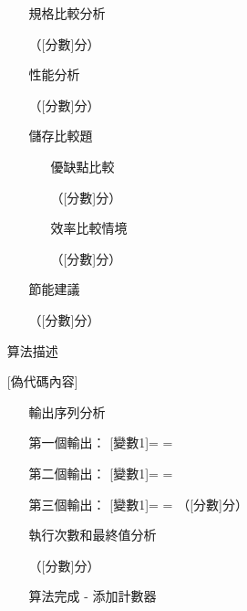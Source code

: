 \documentclass[12pt,a4paper]{article}
\newcommand{\answerline}[1]{\underline{\hspace{#1}}}
\begin{document}
\begin{enumerate}
\begin{enumerate}[label=(\alph*)]
\item [規格比較分析]

\answerline{15cm}

\answerline{15cm} （[分數]分）

\item [性能分析]

\answerline{15cm} （[分數]分）

\item [儲存比較題]

\begin{enumerate}[label=(\roman*)]
\item [優缺點比較]

\answerline{15cm}

\answerline{15cm}

\answerline{15cm} （[分數]分）

\item [效率比較情境]

\answerline{15cm}

\answerline{15cm} （[分數]分）

\end{enumerate}

\item [節能建議]

\answerline{15cm}

\answerline{15cm} （[分數]分）

\end{enumerate}

\item [算法描述]

[偽代碼內容]

\begin{enumerate}[label=(\alph*)]
\item [輸出序列分析]

第一個輸出： [變數1]=\answerline{2cm} \quad [變數2]=\answerline{2cm}

第二個輸出： [變數1]=\answerline{2cm} \quad [變數2]=\answerline{2cm}

第三個輸出： [變數1]=\answerline{2cm} \quad [變數2]=\answerline{2cm} （[分數]分）

\item [執行次數和最終值分析]

\answerline{15cm}

\answerline{15cm} （[分數]分）

\item [算法完成 - 添加計數器]


\end{enumerate}
\end{enumerate}
\end{document}

